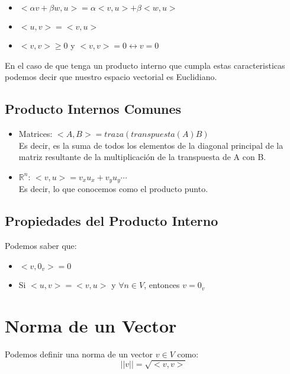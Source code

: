 \documentclass[12pt]{report}                                %
\begin{document}
        \begin{itemize}
            \item $<\alpha v + \beta w, u> = \alpha <v, u> + \beta <w, u>$
            \item $<u, v> = <v, u>$
            \item $<v, v> \geq 0 $ y $ <v, v> = 0 \leftrightarrow v = 0$
        \end{itemize}

        En el caso de que tenga un producto interno que cumpla estas caracteristicas
        podemos decir que nuestro espacio vectorial es Euclidiano.

        \subsection{Producto Internos Comunes}

        \begin{itemize}
            \item Matrices: $<A, B> = traza( transpuesta(A)B)$ \\ Es decir, es la suma de
            todos los elementos de la diagonal
            principal de la matriz resultante de la multiplicación de la transpuesta de A con B.

            \item $\mathbb{R}^n$: $<v, u> = v_x u_x + v_y u_y \cdots$ \\ Es decir, lo que
            conocemos como el producto punto. 
        \end{itemize}


        \subsection{Propiedades del Producto Interno}
        Podemos saber que:
        \begin{itemize}
            \item $<v, 0_v> = 0$
            \item Si $<u, v> = <v, u>$ y $\forall n \in V$, entonces $v = 0_v$
        \end{itemize}


    \clearpage
    \section{Norma de un Vector}
        Podemos definir una norma de un vector $v \in V$ como:
        \begin{equation}
            ||v|| = \sqrt{<v,v>}
        \end{equation}
\end{document}
